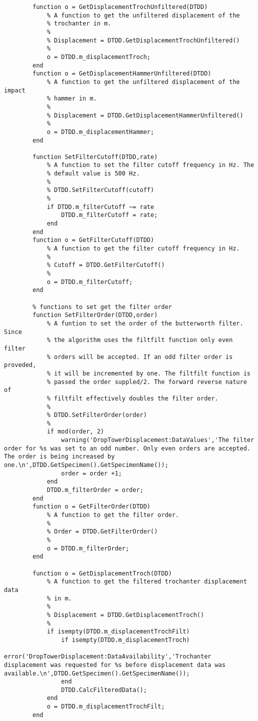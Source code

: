 \begin{lstlisting}
        function o = GetDisplacementTrochUnfiltered(DTDD)
            % A function to get the unfiltered displacement of the
            % trochanter in m.
            %
            % Displacement = DTDD.GetDisplacementTrochUnfiltered()
            %
            o = DTDD.m_displacementTroch;
        end
        function o = GetDisplacementHammerUnfiltered(DTDD)
            % A function to get the unfiltered displacement of the impact
            % hammer in m.
            %
            % Displacement = DTDD.GetDisplacementHammerUnfiltered()
            %
            o = DTDD.m_displacementHammer;
        end
        
        function SetFilterCutoff(DTDD,rate)
            % A function to set the filter cutoff frequency in Hz. The
            % default value is 500 Hz.
            %
            % DTDD.SetFilterCutoff(cutoff)
            %
            if DTDD.m_filterCutoff ~= rate
                DTDD.m_filterCutoff = rate;
            end
        end
        function o = GetFilterCutoff(DTDD)
            % A function to get the filter cutoff frequency in Hz.
            %
            % Cutoff = DTDD.GetFilterCutoff()
            %
            o = DTDD.m_filterCutoff;
        end
        
        % functions to set get the filter order
        function SetFilterOrder(DTDD,order)
            % A funtion to set the order of the butterworth filter. Since
            % the algorithm uses the filtfilt function only even filter
            % orders will be accepted. If an odd filter order is proveded,
            % it will be incremented by one. The filtfilt function is
            % passed the order suppled/2. The forward reverse nature of
            % filtfilt effectively doubles the filter order.
            %
            % DTDD.SetFilterOrder(order)
            %
            if mod(order, 2)
                warning('DropTowerDisplacement:DataValues','The filter order for %s was set to an odd number. Only even orders are accepted. The order is being increased by one.\n',DTDD.GetSpecimen().GetSpecimenName());
                order = order +1;
            end
            DTDD.m_filterOrder = order;
        end
        function o = GetFilterOrder(DTDD)
            % A function to get the filter order.
            %
            % Order = DTDD.GetFilterOrder()
            %
            o = DTDD.m_filterOrder;
        end

        function o = GetDisplacementTroch(DTDD)
            % A function to get the filtered trochanter displacement data
            % in m.
            %
            % Displacement = DTDD.GetDisplacementTroch()
            %
            if isempty(DTDD.m_displacementTrochFilt)
                if isempty(DTDD.m_displacementTroch)
                    error('DropTowerDisplacement:DataAvailability','Trochanter displacement was requested for %s before displacement data was available.\n',DTDD.GetSpecimen().GetSpecimenName());
                end
                DTDD.CalcFilteredData();
            end
            o = DTDD.m_displacementTrochFilt;
        end
        

\end{lstlisting}
